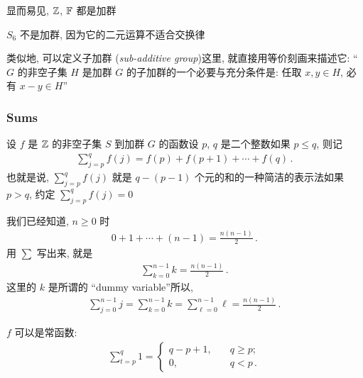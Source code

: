 \begin{example}
    显而易见, $\mathbb{Z}$, $\mathbb{F}$ 都是加群\period
\end{example}

\begin{example}
    $S_6$ 不是加群, 因为它的二元运算不适合交换律\period
\end{example}

\begin{remark}
    类似地, 可以定义子加群 (\textit{sub-additive group})\period 这里, 就直接用等价刻画来描述它: ``$G$ 的非空子集 $H$ 是加群 $G$ 的子加群的一个必要与充分条件是: 任取 $x,y \in H$, 必有 $x-y \in H$\period ''
\end{remark}

\subsubsection*{Sums}

\begin{definition}
    设 $f$ 是 $\mathbb{Z}$ 的非空子集 $S$ 到加群 $G$ 的函数\period 设 $p$, $q$ 是二个整数\period 如果 $p \leq q$, 则记
    \begin{align*}
        \sum_{j = p}^{q} f(j) = f(p) + f(p + 1) + \cdots + f(q)\period
    \end{align*}
    也就是说, $\sum_{j = p}^{q} f(j)$ 就是 $q - (p - 1)$ 个元的和的一种简洁的表示法\period 如果 $p > q$, 约定 $\sum_{j = p}^{q} f(j) = 0$\period
\end{definition}

\begin{example}
    我们已经知道, $n \geq 0$ 时
    \begin{align*}
        0 + 1 + \cdots + (n-1) = \frac{n(n-1)}{2}\period
    \end{align*}
    用 $\sum$ 写出来, 就是
    \begin{align*}
        \sum_{k=0}^{n-1} k = \frac{n(n-1)}{2}\period
    \end{align*}
    这里的 $k$ 是所谓的 ``dummy variable''\period 所以,
    \begin{align*}
        \sum_{j=0}^{n-1} j = \sum_{k=0}^{n-1} k = \sum_{\ell=0}^{n-1} \ell = \frac{n(n-1)}{2}\period
    \end{align*}
\end{example}

\begin{example}
    $f$ 可以是常函数:
    \begin{align*}
        \sum_{t=p}^{q} 1 = \begin{cases}
            q - p + 1, & \quad q \geq p;     \\
            0,         & \quad q < p \period
        \end{cases}
    \end{align*}
\end{example}

